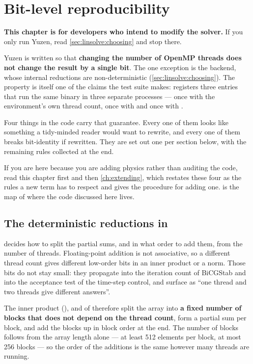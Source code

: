 \chapter{Bit-level reproducibility}
\label{ch:reproducibility}

\textbf{This chapter is for developers who intend to modify the solver.} If you
only run Yuzen, read \cref{sec:linsolve:choosing} and stop there.

Yuzen is written so that \textbf{changing the number of OpenMP threads does not
change the result by a single bit}. The one exception is the 
backend, whose internal reductions are non-deterministic
(\cref{sec:linsolve:choosing}). The property is itself one of the claims the
test suite makes:  registers three entries that run the same binary
in three separate processes --- once with the environment's own thread count,
once with  and once with .

Four things in the code carry that guarantee. Every one of them looks like
something a tidy-minded reader would want to rewrite, and every one of them
breaks bit-identity if rewritten. They are set out one per section below, with
the remaining rules collected at the end.

If you are here because you are adding physics rather than auditing the code,
read this chapter first and then \cref{ch:extending}, which restates these four
as the rules a new term has to respect and gives the procedure for adding one.
 is the map of where the code discussed here lives.

\section{The deterministic reductions in }
\label{sec:repro:reduction}

 decides how to split the
partial sums, and in what order to add them, from the number of threads.
Floating-point addition is not associative, so a different thread count gives
different low-order bits in an inner product or a norm. Those bits do not stay
small: they propagate into the iteration count of BiCGStab and into the
acceptance test of the time-step control, and surface as ``one thread and two
threads give different answers''.

The inner product (),  and  of
 therefore split the array into \textbf{a fixed number of blocks
that does not depend on the thread count}, form a partial sum per block, and
add the blocks up in block order at the end. The number of blocks follows from
the array length alone --- at least 512 elements per block, at most 256 blocks
--- so the order of the additions is the same however many threads are running.

